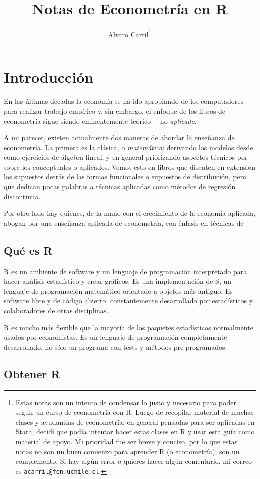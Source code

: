 \documentclass{report}\usepackage[]{graphicx}\usepackage[]{color}
\title{Notas de Econometría en R}
\author{Alvaro Carril\thanks{Estas notas son un intento de condensar lo justo y necesario para poder seguir un curso de econometría con R.
Luego de recopilar material de muchas clases y ayudantías de econometría, en general pensadas para ser aplicadas en Stata, decidí que podía intentar hacer estas clases en R y usar esta guía como material de apoyo.
Mi prioridad fue ser breve y conciso, por lo que estas notas no son un buen comienzo para aprender R (o econometría); son un complemento.
Si hay algún error o quieres hacer algún comentario, mi correo es \texttt{acarril@fen.uchile.cl}.}}
\begin{document}
\maketitle
\tableofcontents

\clearpage




\chapter{Introducción}

En las últimas décadas la economía se ha ido apropiando de los computadores para realizar trabajo empírico y, sin embargo, el enfoque de los libros de econometría sigue siendo eminentemente teórico ---no \emph{aplicado}.

A mi parecer, existen actualmente dos maneras de abordar la enseñanza de econometría. La primera es la clásica, o \emph{matemática}: derivando los modelos desde como ejercicios de álgebra lineal, y en general priorizando aspectos técnicos por sobre los conceptuales o aplicados. Vemos esto en libros que discuten en extensión los supuestos detrás de las formas funcionales o supuestos de distribución, pero que dedican pocas palabras a técnicas aplicadas como métodos de regresión discontinua.

Por otro lado hay quienes, de la mano con el crecimiento de la economía aplicada, abogan por una enseñanza aplicada de econometría, con énfasis en técnicas de 

\section{Qué es R}

R es un ambiente de software y un lenguaje de programación interpretado para hacer análisis estadístico y crear gráficos. Es una implementación de S, un lenguaje de programación matemático orientado a objetos más antiguo. Es software libre y de código abierto, constantemente desarrollado por estadísticos y colaboradores de otras disciplinas.

R es mucho más flexible que la mayoría de los paquetes estadísticos normalmente usados por economistas. Es un lenguaje de programación completamente desarrollado, no sólo un programa con tests y métodos pre-programados.


\section{Obtener R}
\end{document}
